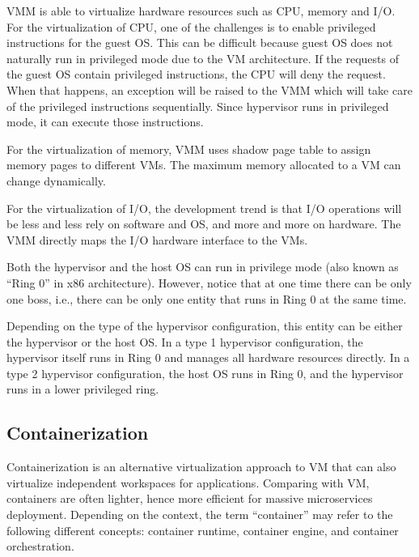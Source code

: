 VMM is able to virtualize hardware resources such as CPU, memory and I/O. For the virtualization of CPU, one of the challenges is to enable privileged instructions for the guest OS. This can be difficult because guest OS does not naturally run in privileged mode due to the VM architecture. If the requests of the guest OS contain privileged instructions, the CPU will deny the request. When that happens, an exception will be raised to the VMM which will take care of the privileged instructions sequentially. Since hypervisor runs in privileged mode, it can execute those instructions.

For the virtualization of memory, VMM uses shadow page table to assign memory pages to different VMs. The maximum memory allocated to a VM can change dynamically.

For the virtualization of I/O, the development trend is that I/O operations will be less and less rely on software and OS, and more and more on hardware. The VMM directly maps the I/O hardware interface to the VMs.

\begin{shortbox}
	Both the hypervisor and the host OS can run in privilege mode (also known as ``Ring 0'' in x86 architecture). However, notice that at one time there can be only one boss, i.e., there can be only one entity that runs in Ring 0 at the same time.
	
	Depending on the type of the hypervisor configuration, this entity can be either the hypervisor or the host OS. In a type 1 hypervisor configuration, the hypervisor itself runs in Ring 0 and manages all hardware resources directly. In a type 2 hypervisor configuration, the host OS runs in Ring 0, and the hypervisor runs in a lower privileged ring.
\end{shortbox}

\subsection{Containerization}

Containerization is an alternative virtualization approach to VM that can also virtualize independent workspaces for applications. Comparing with VM, containers are often lighter, hence more efficient for massive microservices deployment. Depending on the context, the term ``container'' may refer to the following different concepts: container runtime, container engine, and container orchestration.

